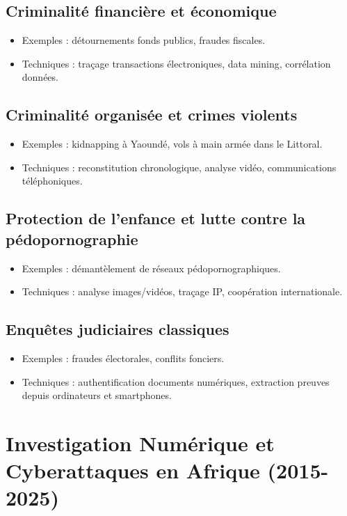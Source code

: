 \documentclass[12pt]{article}
\begin{document}
\begin{center}
\subsection{ Criminalité financière et économique}
\begin{itemize}[leftmargin=*, label=\textbullet]
    \item Exemples : détournements fonds publics, fraudes fiscales.
    \item Techniques : traçage transactions électroniques, data mining, corrélation données.
\end{itemize}

\subsection{Criminalité organisée et crimes violents}
\begin{itemize}[leftmargin=*, label=\textbullet]
    \item Exemples : kidnapping à Yaoundé, vols à main armée dans le Littoral.
    \item Techniques : reconstitution chronologique, analyse vidéo, communications téléphoniques.
\end{itemize}

\subsection{ Protection de l’enfance et lutte contre la pédopornographie}
\begin{itemize}[leftmargin=*, label=\textbullet]
    \item Exemples : démantèlement de réseaux pédopornographiques.
    \item Techniques : analyse images/vidéos, traçage IP, coopération internationale.
\end{itemize}

\subsection{ Enquêtes judiciaires classiques}
\begin{itemize}[leftmargin=*, label=\textbullet]
    \item Exemples : fraudes électorales, conflits fonciers.
    \item Techniques : authentification documents numériques, extraction preuves depuis ordinateurs et smartphones.
\end{itemize}


\section{Investigation Numérique et Cyberattaques en Afrique (2015-2025)}


\end{center}
\end{document}
